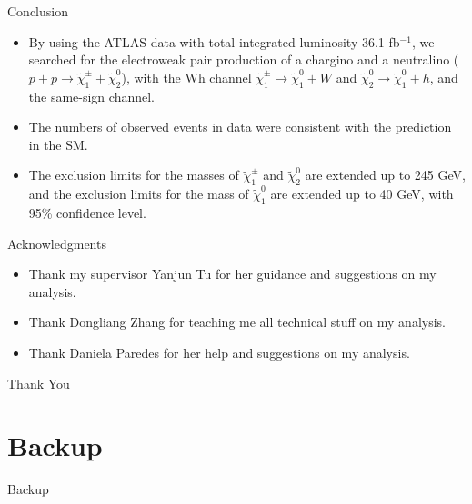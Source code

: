 \documentclass[mathserif,serif]{beamer}
\begin{document}
\begin{frame}{Conclusion}
\begin{itemize}
\item By using the ATLAS data with total integrated luminosity 36.1 fb$^{-1}$, we searched for the electroweak pair production of a chargino and a neutralino
($p + p \rightarrow \tilde{\chi}_1^\pm + \tilde{\chi}_2^0$), with the Wh channel $\tilde{\chi}_1^\pm \rightarrow \tilde{\chi}_1^0 + W$ and $\tilde{\chi}_2^0 \rightarrow \tilde{\chi}_1^0 + h$, and the same-sign channel.
\item The numbers of observed events in data were consistent with the prediction in the SM.
\item The exclusion limits for the masses of $\tilde{\chi}_1^\pm$ and $\tilde{\chi}_2^0$ are extended up to 245 GeV, and the exclusion limits for the mass of $\tilde{\chi}_1^0$ are extended up to 40 GeV, with 95\% confidence level.
\end{itemize}
\end{frame}

\begin{frame}{Acknowledgments}
\begin{itemize}
\item Thank my supervisor Yanjun Tu for her guidance and suggestions on my analysis.
\item Thank Dongliang Zhang for teaching me all technical stuff on my analysis.
\item Thank Daniela Paredes for her help and suggestions on my analysis.
\end{itemize}
\end{frame}

\begin{frame}
\begin{center}
\huge
Thank You
\end{center}
\end{frame}

\section{Backup}
\begin{frame}
\begin{center}
\huge
Backup
\end{center}
\end{frame}
\end{document}
